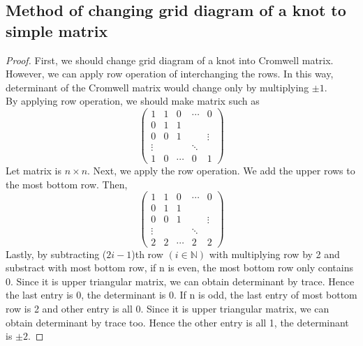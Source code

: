 \documentclass{article}
\begin{document}
\subsection{Method of changing grid diagram of a knot to simple matrix}
\begin{proof}
First, we should change grid diagram of a knot into Cromwell matrix. However, we can apply row operation of interchanging the rows. In this way, determinant of the Cromwell matrix would change only by multiplying $\pm 1$.\\
By applying row operation, we should make matrix such as
    $$\begin{pmatrix} 
    1 & 1 & 0 & \cdots & 0\\
    0 & 1 & 1 &  &  \\
    0 & 0 & 1 & & \vdots\\ 
    \vdots & & & \ddots & \\
    1 & 0 & \cdots & 0 & 1
    \end{pmatrix}$$
Let matrix is $n\times n$.
Next, we apply the row operation. We add the upper rows to the most bottom row. Then,
    $$\begin{pmatrix} 
    1 & 1 & 0 & \cdots & 0\\
    0 & 1 & 1 &  &  \\
    0 & 0 & 1 & & \vdots\\ 
    \vdots & & & \ddots & \\
    2 & 2 & \cdots & 2 & 2
    \end{pmatrix}$$
Lastly, by subtracting ($2i-1$)th row $(i \in \mathbb{N})$ with multiplying row by 2 and substract with most bottom row, if n is even, the most bottom row only contains 0. Since it is upper triangular matrix, we can obtain determinant by trace. Hence the last entry is 0, the determinant is 0. If n is odd, the last entry of most bottom row is 2 and other entry is all 0. Since it is upper triangular matrix, we can obtain determinant by trace too. Hence the other entry is all 1, the determinant is $\pm 2$.




\end{proof}
\end{document}
